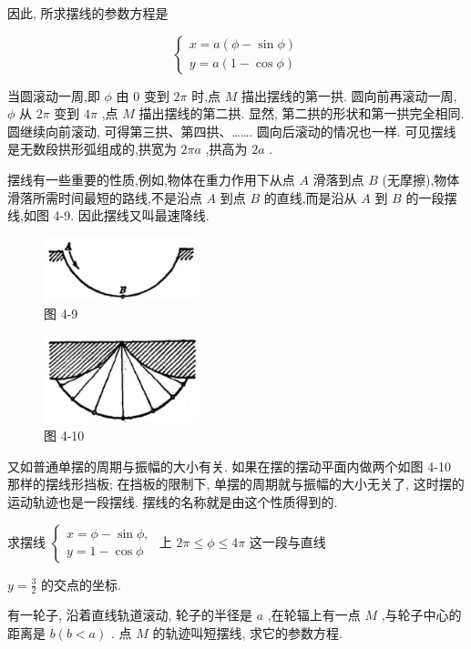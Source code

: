 \documentclass[lang=cn,newtx,10.5pt,scheme=chinese]{elegantbook}
\begin{document}
因此, 所求摆线的参数方程是

\[
  \left\{ \begin{array}{l} x = a\left( {\phi - \sin \phi }\right) \\ y = a\left( {1 - \cos \phi }\right) \end{array}\right.
\]

当圆滚动一周,即 \(\phi\) 由 0 变到 \({2\pi }\) 时,点 \(M\) 描出摆线的第一拱. 圆向前再滚动一周, \(\phi\) 从 \({2\pi }\) 变到 \({4\pi }\) ,点 \(M\) 描出摆线的第二拱. 显然, 第二拱的形状和第一拱完全相同. 圆继续向前滚动, 可得第三拱、第四拱、……. 圆向后滚动的情况也一样. 可见摆线是无数段拱形弧组成的,拱宽为 \({2\pi a}\) ,拱高为 \({2a}\) .

摆线有一些重要的性质,例如,物体在重力作用下从点 \(A\) 滑落到点 \(B\) (无摩擦),物体滑落所需时间最短的路线,不是沿点 \(A\) 到点 \(B\) 的直线,而是沿从 \(A\) 到 \(B\) 的一段摆线,如图 4-9. 因此摆线又叫最速降线.

\begin{figure}[h]
  \centering
  \includegraphics[max width=0.4\textwidth]{images/01912cc2-ffb6-728e-9ae7-b113ff05c64b_170_643449.jpg}
  \caption{图 4-9}
\end{figure}



\begin{figure}[h]
  \centering
  \includegraphics[max width=0.4\textwidth]{images/01912cc2-ffb6-728e-9ae7-b113ff05c64b_170_567819.jpg}
  \caption{图 4-10}
\end{figure}



又如普通单摆的周期与振幅的大小有关. 如果在摆的摆动平面内做两个如图 4-10 那样的摆线形挡板; 在挡板的限制下, 单摆的周期就与振幅的大小无关了, 这时摆的运动轨迹也是一段摆线. 摆线的名称就是由这个性质得到的.

\begin{problemset}[练习]

\item 求摆线 \(\left\{ \begin{array}{l} x = \phi - \sin \phi , \\ y = 1 - \cos \phi \end{array}\right.\) 上 \({2\pi } \leq \phi \leq {4\pi }\) 这一段与直线

\(y = \frac{3}{2}\) 的交点的坐标.

\item 有一轮子, 沿着直线轨道滚动, 轮子的半径是 \(a\) ,在轮辐上有一点 \(M\) ,与轮子中心的距离是 \(b\left( {b < a}\right)\) . 点 \(M\) 的轨迹叫短摆线, 求它的参数方程.

\end{problemset}
\end{document}

